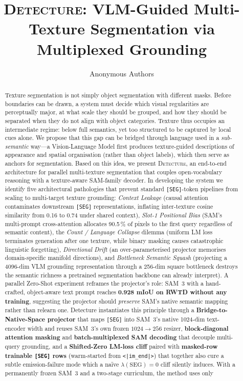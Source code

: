 \documentclass{article}
\title{\textsc{Detecture}: VLM-Guided Multi-Texture Segmentation via Multiplexed Grounding}
\author{%
  Anonymous Authors
}
\begin{document}
\maketitle

\begin{abstract}
Texture segmentation is not simply object segmentation with different masks. Before boundaries can be drawn, a system must decide which visual regularities are perceptually major, at what scale they should be grouped, and how they should be separated when they do not align with object categories. Texture thus occupies an intermediate regime: below full semantics, yet too structured to be captured by local cues alone. We propose that this gap can be bridged through language used in a \emph{sub-semantic} way---a Vision-Language Model first produces texture-guided descriptions of appearance and spatial organisation (rather than object labels), which then serve as anchors for segmentation. Based on this idea, we present \textsc{Detecture}, an end-to-end architecture for parallel multi-texture segmentation that couples open-vocabulary reasoning with a texture-aware SAM-family decoder. In developing the system we identify five architectural pathologies that prevent standard \texttt{[SEG]}-token pipelines from scaling to multi-target texture grounding: \emph{Context Leakage} (causal attention contaminates downstream \texttt{[SEG]} representations, inflating inter-texture cosine similarity from 0.16 to 0.74 under shared context), \emph{Slot-1 Positional Bias} (SAM's multi-prompt cross-attention allocates 90.5\,\% of pixels to the first query regardless of semantic content), the \emph{Count / Language Collapse} dilemma (uniform LM loss terminates generation after one texture, while binary masking causes catastrophic linguistic forgetting), \emph{Directional Drift} (an over-parameterised projector memorises domain-specific manifold directions), and \emph{Bottleneck Semantic Squash} (projecting a 4096-dim VLM grounding representation through a 256-dim square bottleneck destroys the semantic richness a pretrained segmentation backbone can already interpret). A parallel Zero-Shot experiment reframes the projector's role: SAM~3 with a hand-crafted, object-aware text prompt reaches \textbf{0.928 mIoU on RWTD without any training}, suggesting the projector should \emph{preserve} SAM's native semantic mapping rather than relearn one. Detecture instantiates this principle through a \textbf{Bridge-to-Native-Space projector} that maps \texttt{[SEG]} into SAM~3's native 1024-dim text-encoder width and reuses SAM~3's own frozen $1024 \to 256$ resizer, \textbf{block-diagonal attention masking} and \textbf{batch-multiplexed SAM decoding} that decouple multi-query grounding, and a \textbf{Shifted-Zero LM-loss cliff} paired with \textbf{masked-row trainable \texttt{[SEG]} rows} (warm-started from \texttt{<|im\_end|>}) that together also cure a subtle emission-failure mode which a na\"ive $\lambda(\text{SEG}) = 0$ cliff silently induces. With a permanently frozen SAM~3 and a two-stage curriculum, the method uses only 
\end{abstract}
\end{document}
